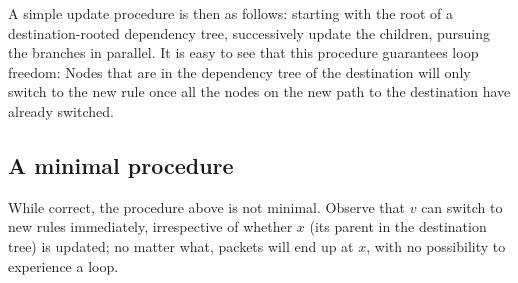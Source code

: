 A simple update procedure is then as follows: starting with the root of a destination-rooted dependency tree, successively update the children, pursuing the branches in parallel.
It is easy to see that this procedure guarantees loop freedom: Nodes that are in the dependency tree of the destination will only switch to the new rule once all the nodes on the new path to the destination have already switched.









\subsection{A minimal procedure}
\label{sec:minimal}


While correct, the procedure above is not minimal. Observe that $v$ can switch to new rules immediately, irrespective of whether $x$ (its parent in the destination tree) is updated; no matter what, packets will end up at $x$, with no possibility to experience a loop.

